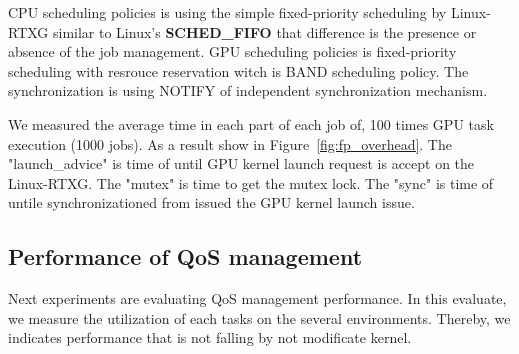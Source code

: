 CPU scheduling policies is using the simple fixed-priority scheduling by Linux-RTXG similar to Linux's \textbf{SCHED\_FIFO} that difference is the presence or absence of the job management.
GPU scheduling policies is fixed-priority scheduling with resrouce reservation witch is BAND scheduling policy.
The synchronization is using NOTIFY of independent synchronization mechanism.

We measured the average time in each part of each job of, 100 times GPU task execution (1000 jobs).
As a result show in Figure~\ref{fig:fp_overhead}.
The "launch\_advice" is time of until GPU kernel launch request is accept on the Linux-RTXG.
The "mutex" is time to get the mutex lock.
The "sync" is time of untile synchronizationed from issued the GPU kernel launch issue.




%




\subsection{Performance of QoS management}
Next experiments are evaluating QoS management performance.
In this evaluate, we measure the utilization of each tasks on the several environments.
Thereby, we indicates performance that is not falling by not modificate kernel.

